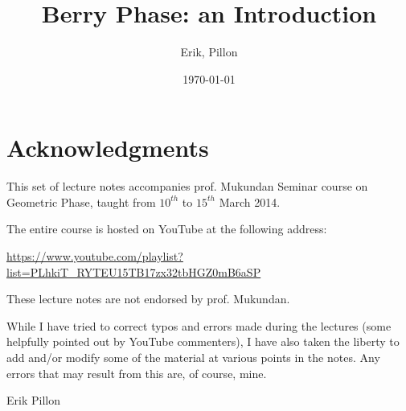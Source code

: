 \documentclass[12pt,parskip=half, DIV=calc, BCOR=10mm, x11names]{scrbook}
\title{Berry Phase: an Introduction}
\date{\today}
\author{Erik, Pillon}
\theoremstyle{remark}
\begin{document}
\maketitle
\frontmatter


\section*{Acknowledgments}
This set of lecture notes accompanies prof. Mukundan Seminar course on Geometric Phase, taught from $ 10^{th} $ to $ 15^{th} $ March 2014.

The entire course is hosted on YouTube at the following address:
\begin{center}
	\url{https://www.youtube.com/playlist?list=PLhkiT_RYTEU15TB17zx32tbHGZ0mB6aSP}
\end{center}
These lecture notes are not endorsed by prof. Mukundan.

While I have tried to correct typos and errors made during the lectures (some helpfully pointed out by YouTube commenters), I have also taken the liberty to add and/or modify some of the material at various points in the notes. Any errors that may result from this are, of course, mine.


\hfill {\ECFJD \Large Erik Pillon ~~~}
\tableofcontents

\mainmatter






%
%
%
%
\backmatter

%

\end{document}
